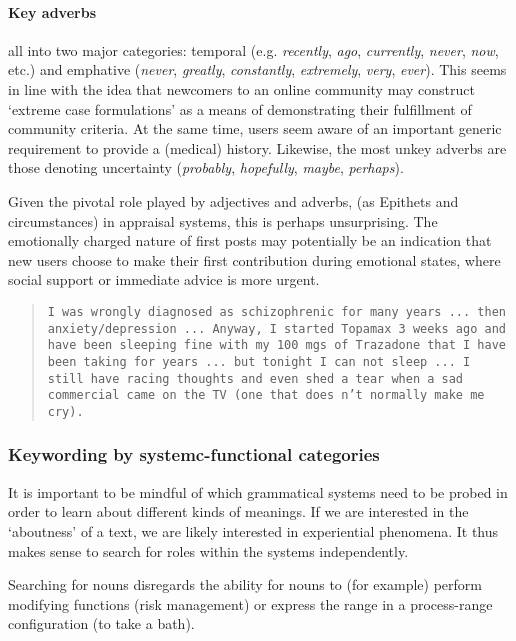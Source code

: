 \paragraph{Key adverbs} all into two major categories: temporal (e.g. \emph{recently}, \emph{ago}, \emph{currently}, \emph{never}, \emph{now}, etc.) and emphative (\emph{never}, \emph{greatly}, \emph{constantly}, \emph{extremely}, \emph{very}, \emph{ever}). This seems in line with the idea that newcomers to an online community may construct `extreme case formulations' as a means of demonstrating their fulfillment of community criteria. At the same time, users seem aware of an important generic requirement to provide a (medical) history. Likewise, the most unkey adverbs are those denoting uncertainty (\emph{probably}, \emph{hopefully}, \emph{maybe}, \emph{perhaps}).

Given the pivotal role played by adjectives and adverbs, (as Epithets and circumstances) in appraisal systems, this is perhaps unsurprising. The emotionally charged nature of first posts may potentially be an indication that new users choose to make their first contribution during emotional states, where social support or immediate advice is more urgent.

\begin{quotation} \singlespacing \small \texttt{I was wrongly diagnosed as schizophrenic for many years ... then anxiety/depression ... Anyway, I started Topamax 3 weeks ago and have been sleeping fine with my 100 mgs of Trazadone that I have been taking for years ... but tonight I can not sleep ... I still have racing thoughts and even shed a tear when a sad commercial came on the TV (one that does n't normally make me cry).}
\end{quotation}

\subsubsection{Keywording by systemc-functional categories}

It is important to be mindful of which grammatical systems need to be probed in order to learn about different kinds of meanings. If we are interested in the `aboutness' of a text, we are likely interested in experiential phenomena. It thus makes sense to search for roles within the systems independently.

Searching for nouns disregards the ability for nouns to (for example) perform modifying functions (risk management) or express the range in a process-range configuration (to take a bath).~

